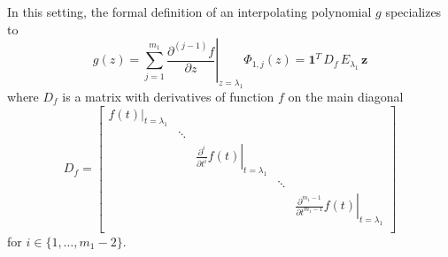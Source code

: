 In this setting, the formal definition of an interpolating polynomial $g$ specializes to
\begin{displaymath}
g(z) = \sum_{j=1}^{m_{1}}{ \left.  \frac{\partial^{(j-1)}{f}}{\partial{z}} \right|_{z=\lambda_{1}}\Phi_{1,j}(z) } = \boldsymbol{1}^{T}\,D_{f}\, E_{\lambda_{1}} \,\boldsymbol{z}
\end{displaymath}
where $D_{f}$ is a matrix with derivatives of function $f$ on the main diagonal
\begin{displaymath}
D_{f} = 
\left[
    \begin{array}{ccccc}
        \left.f(t)\right|_{t=\lambda_{1}} & \\
                                          &  \ddots \\
                                          &         & \left.\frac{\partial^{i}}{\partial t^{i}}f(t)\right|_{t=\lambda_{1}} \\
                                          &         &                                                                       & \ddots \\
                                          &         &                                                                       &        &  \left.\frac{\partial^{m_{1}-1}}{\partial t^{m_{1}-1}}f(t)\right|_{t=\lambda_{1}} \\
    \end{array}
\right]
\end{displaymath}
for $i\in  \lbrace 1,\ldots,m_{1}-2 \rbrace$.
